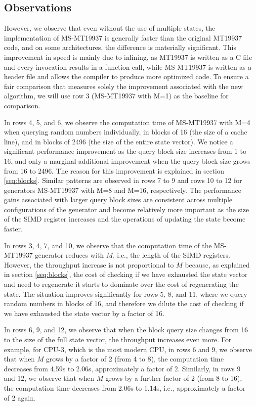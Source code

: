 \documentclass[preprint,1p,times]{elsarticle}
\begin{document}
\subsection{Observations}
However, we observe that even without the use of multiple states, the implementation of MS-MT19937 is generally faster than the original MT19937 code, and on some architectures, the difference is materially significant. This improvement in speed is mainly due to inlining, as MT19937 is written as a C file and every invocation results in a function call, while MS-MT19937 is written as a header file and allows the compiler to produce more optimized code. To ensure a fair comparison that measures solely the improvement associated with the new algorithm, we will use row 3 (MS-MT19937 with M=1) as the baseline for comparison.

In rows 4, 5, and 6, we observe the computation time of MS-MT19937 with M=4 when querying random numbers individually, in blocks of 16 (the size of a cache line), and in blocks of 2496 (the size of the entire state vector). We notice a significant performance improvement as the query block size increases from 1 to 16, and only a marginal additional improvement when the query block size grows from 16 to 2496. The reason for this improvement is explained in section \ref{seq:blocks}. Similar patterns are observed in rows 7 to 9 and rows 10 to 12 for generators MS-MT19937 with M=8 and M=16, respectively. The performance gains associated with larger query block sizes are consistent across multiple configurations of the generator and become relatively more important as the size of the SIMD register increases and the operations of updating the state become faster.

In rows 3, 4, 7, and 10, we observe that the computation time of the MS-MT19937 generator reduces with $M$, i.e., the length of the SIMD registers. However, the throughput increase is not proportional to $M$ because, as explained in section \ref{seq:blocks}, the cost of checking if we have exhausted the state vector and need to regenerate it starts to dominate over the cost of regenerating the state. The situation improves significantly for rows 5, 8, and 11, where we query random numbers in blocks of 16, and therefore we dilute the cost of checking if we have exhausted the state vector by a factor of 16.

In rows 6, 9, and 12, we observe that when the block query size changes from 16 to the size of the full state vector, the throughput increases even more. For example, for CPU-3, which is the most modern CPU, in rows 6 and 9, we observe that when $M$ grows by a factor of 2 (from 4 to 8), the computation time decreases from 4.59s to 2.06s, approximately a factor of 2. Similarly, in rows 9 and 12, we observe that when $M$ grows by a further factor of 2 (from 8 to 16), the computation time decreases from 2.06s to 1.14s, i.e., approximately a factor of 2 again.
\end{document}
